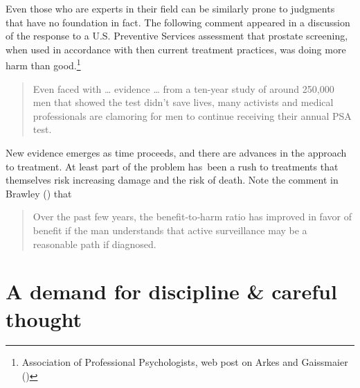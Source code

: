 \documentclass[
  10ptls,
  b5paper]{book}
\begin{document}
Even those who are experts in their field can be similarly prone to judgments that have no foundation in fact. The following comment appeared in a discussion of
the response to a U.S. Preventive Services assessment that prostate screening,
when used in accordance with then current treatment practices, was doing more
harm than good.\footnote{Association of Professional Psychologists, web post on Arkes and Gaissmaier ()}

\begin{quote}
Even faced with \ldots{} evidence \ldots{} from a ten-year study of around 250,000
men that showed the test didn't save lives, many activists and medical professionals are clamoring for men to continue receiving their annual PSA test.
\end{quote}

New evidence emerges as time proceeds, and there are advances in the approach to treatment. At least part of the problem has~been a rush to treatments that themselves risk increasing damage and the risk of death. Note the comment in Brawley () that

\begin{quote}
Over the past few years, the benefit‐to‐harm ratio has improved in favor of benefit if the man understands that active surveillance may be a reasonable path if diagnosed.
\end{quote}

\section{A demand for discipline \& careful thought}\label{a-demand-for-discipline-careful-thought}
\end{document}
